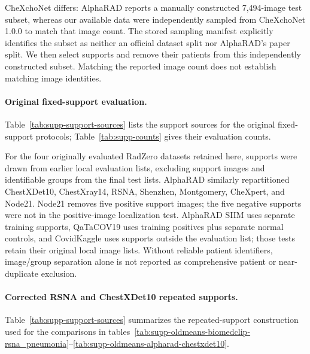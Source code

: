 CheXchoNet differs: AlphaRAD reports a manually constructed 7,494-image test subset, whereas our available data were independently sampled from CheXchoNet 1.0.0 to match that image count. The stored sampling manifest explicitly identifies the subset as neither an official dataset split nor AlphaRAD's paper split. We then select supports and remove their patients from this independently constructed subset. Matching the reported image count does not establish matching image identities.

\paragraph{Original fixed-support evaluation.}
Table~\ref{tab:supp-support-sources} lists the support sources for the original fixed-support protocols; Table~\ref{tab:supp-counts} gives their evaluation counts.

For the four originally evaluated RadZero datasets retained here, supports were drawn from earlier local evaluation lists, excluding support images and identifiable groups from the final test lists. AlphaRAD similarly repartitioned ChestXDet10, ChestXray14, RSNA, Shenzhen, Montgomery, CheXpert, and Node21. Node21 removes five positive support images; the five negative supports were not in the positive-image localization test. AlphaRAD SIIM uses separate training supports, QaTaCOV19 uses training positives plus separate normal controls, and CovidKaggle uses supports outside the evaluation list; those tests retain their original local image lists. Without reliable patient identifiers, image/group separation alone is not reported as comprehensive patient or near-duplicate exclusion.

\paragraph{Corrected RSNA and ChestXDet10 repeated supports.}
Table~\ref{tab:supp-support-sources} summarizes the repeated-support construction used for the comparisons in tables~\ref{tab:supp-oldmeans-biomedclip-rsna_pneumonia}--\ref{tab:supp-oldmeans-alpharad-chestxdet10}.

